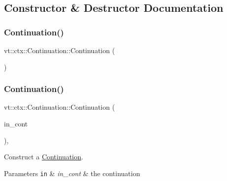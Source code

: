 \subsection{Constructor \& Destructor Documentation}
\mbox{\label{structvt_1_1ctx_1_1_continuation_a161c480097907c7cc11f112ea6130a39}} 
\subsubsection{\texorpdfstring{Continuation()}{Continuation()}\hspace{0.1cm}{\footnotesize\ttfamily [1/2]}}
{\footnotesize\ttfamily vt\+::ctx\+::\+Continuation\+::\+Continuation (\begin{DoxyParamCaption}{ }\end{DoxyParamCaption})\hspace{0.3cm}{\ttfamily [default]}}

\mbox{\label{structvt_1_1ctx_1_1_continuation_ad18f8613f142fa3ed0e08f9d8df4e05a}} 
\subsubsection{\texorpdfstring{Continuation()}{Continuation()}\hspace{0.1cm}{\footnotesize\ttfamily [2/2]}}
{\footnotesize\ttfamily vt\+::ctx\+::\+Continuation\+::\+Continuation (\begin{DoxyParamCaption}\item[{\hyperlink{namespacevt_ae0a5a7b18cc99d7b732cb4d44f46b0f3}{Action\+Type}}]{in\+\_\+cont }\end{DoxyParamCaption})\hspace{0.3cm}{\ttfamily [inline]}, {\ttfamily [explicit]}}



Construct a {\ttfamily \hyperlink{structvt_1_1ctx_1_1_continuation}{Continuation}}. 


\begin{DoxyParams}[1]{Parameters}
\mbox{\tt in}  & {\em in\+\_\+cont} & the continuation \\
\hline
\end{DoxyParams}


